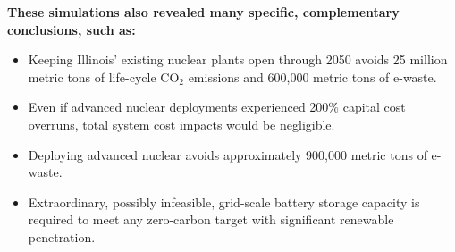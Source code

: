 \textbf{These simulations also revealed many specific, complementary 
conclusions, such as:}
\begin{itemize}
        \item Keeping Illinois' existing nuclear plants open through 
                2050 avoids 25 million metric tons of life-cycle CO$_2$ 
                emissions and 600,000 metric tons of e-waste.
        \item Even if advanced nuclear deployments experienced 200\% capital 
                cost overruns, total system cost impacts would be negligible.
        \item Deploying advanced nuclear avoids approximately 900,000 metric 
                tons of e-waste. 
         \item Extraordinary, possibly infeasible, grid-scale battery storage capacity
                is required to meet any zero-carbon target with significant renewable
                penetration.
\end{itemize}

